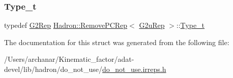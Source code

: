 \mbox{\label{structHadron_1_1RemovePCRep_3_01G2uRep_01_4_a3f2f1b8d829dddece230705318521005}} 
\subsubsection{\texorpdfstring{Type\_t}{Type\_t}\hspace{0.1cm}{\footnotesize\ttfamily [2/2]}}
{\footnotesize\ttfamily typedef \mbox{\hyperlink{structHadron_1_1G2Rep}{G2\+Rep}} \mbox{\hyperlink{structHadron_1_1RemovePCRep}{Hadron\+::\+Remove\+P\+C\+Rep}}$<$ \mbox{\hyperlink{structHadron_1_1G2uRep}{G2u\+Rep}} $>$\+::\mbox{\hyperlink{structHadron_1_1RemovePCRep_3_01G2uRep_01_4_a3f2f1b8d829dddece230705318521005}{Type\+\_\+t}}}



The documentation for this struct was generated from the following file\+:\begin{DoxyCompactItemize}
\item 
/\+Users/archanar/\+Kinematic\+\_\+factor/adat-\/devel/lib/hadron/do\+\_\+not\+\_\+use/\mbox{\hyperlink{adat-devel_2lib_2hadron_2do__not__use_2do__not__use_8irreps_8h}{do\+\_\+not\+\_\+use.\+irreps.\+h}}\end{DoxyCompactItemize}
